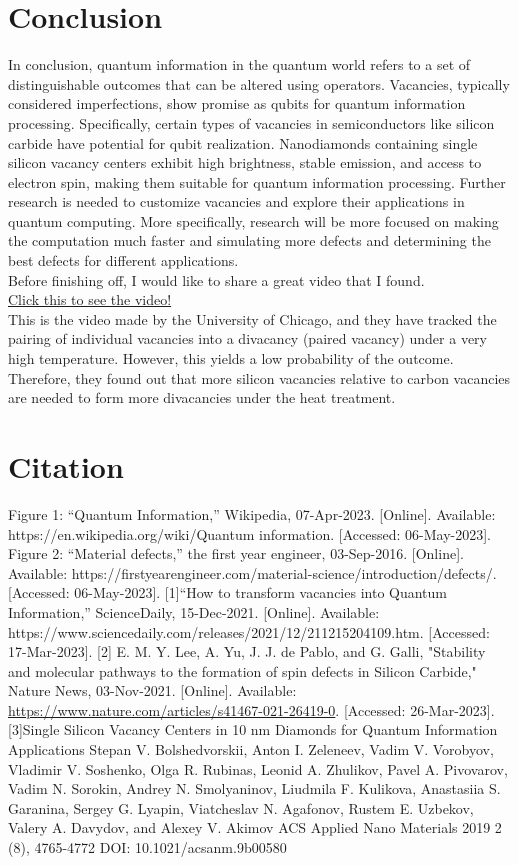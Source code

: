 \documentclass{article}
\begin{document}
\section{Conclusion}
In conclusion, quantum information in the quantum world refers to a set of distinguishable outcomes that can be altered using operators.
Vacancies, typically considered imperfections, show promise as qubits for quantum information processing. Specifically, certain types of vacancies in semiconductors like silicon carbide have potential for qubit realization.
Nanodiamonds containing single silicon vacancy centers exhibit high brightness, stable emission, and access to electron spin, making them suitable for quantum information processing. 
Further research is needed to customize vacancies and explore their applications in quantum computing.
More specifically, research will be more focused on making the computation much faster and simulating more defects 
and determining the best defects for different applications. \\
Before finishing off, I would like to share a great video that I found. \\
\href{https://www.youtube.com/watch?v=KZIyG9II514}{Click this to see the video!} \\
This is the video made by the University of Chicago, and they have tracked the pairing of individual vacancies 
into a divacancy (paired vacancy) under a very high temperature. However, this yields a low probability of the outcome.
Therefore, they found out that more silicon vacancies relative to carbon vacancies are needed to form more divacancies under the 
heat treatment.


\section{Citation}
Figure 1: “Quantum Information,” Wikipedia, 07-Apr-2023. [Online]. Available: https://en.wikipedia.org/wiki/Quantum information. [Accessed: 06-May-2023]. 
Figure 2: “Material defects,” the first year engineer, 03-Sep-2016. [Online]. Available: https://firstyearengineer.com/material-science/introduction/defects/. [Accessed: 06-May-2023]. 
[1]“How to transform vacancies into Quantum Information,” ScienceDaily, 15-Dec-2021. [Online]. Available: https://www.sciencedaily.com/releases/2021/12/211215204109.htm. [Accessed: 17-Mar-2023].  
[2] E. M. Y. Lee, A. Yu, J. J. de Pablo, and G. Galli, "Stability and molecular pathways to the formation of spin defects in Silicon Carbide," Nature News, 03-Nov-2021. [Online]. Available: \url{https://www.nature.com/articles/s41467-021-26419-0}. [Accessed: 26-Mar-2023]. 
[3]Single Silicon Vacancy Centers in 10 nm Diamonds for Quantum Information Applications
Stepan V. Bolshedvorskii, Anton I. Zeleneev, Vadim V. Vorobyov, Vladimir V. Soshenko, Olga R. Rubinas, Leonid A. Zhulikov, Pavel A. Pivovarov, Vadim N. Sorokin, Andrey N. Smolyaninov, Liudmila F. Kulikova, Anastasiia S. Garanina, Sergey G. Lyapin, Viatcheslav N. Agafonov, Rustem E. Uzbekov, Valery A. Davydov, and Alexey V. Akimov
ACS Applied Nano Materials 2019 2 (8), 4765-4772
DOI: 10.1021/acsanm.9b00580
\end{document}
